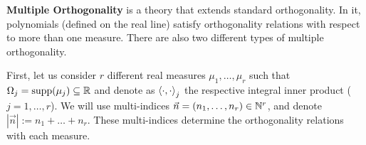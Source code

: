 \documentclass[portrait,final,a0paper,fontscale=0.38]{baposter}
\begin{document}
\begin{poster}



  {

\begin{multicols}{2}

\textbf{Multiple Orthogonality} is a theory that extends standard orthogonality. In it, polynomials (defined on the real line) satisfy orthogonality relations with respect to more than one measure. There are also two different types of multiple orthogonality.

First, let us consider $r$ different real measures $\mu_1,\dots,\mu_r$ such that $\Omega_j=\mathrm{supp}(\mu_j)\subseteq\mathbb{R}$ and denote as $\left\langle \cdot , \cdot \right\rangle_j$ the respective integral inner product ($j=1,\dots,r$). We will use multi-indices $\vec n = (n_1, \dots,n_r)\in \mathbb{N}^r$, and denote $|\vec n| := n_1 + \dots + n_r$. These multi-indices determine the orthogonality relations with each measure.


\end{multicols}}
\end{poster}
\end{document}
